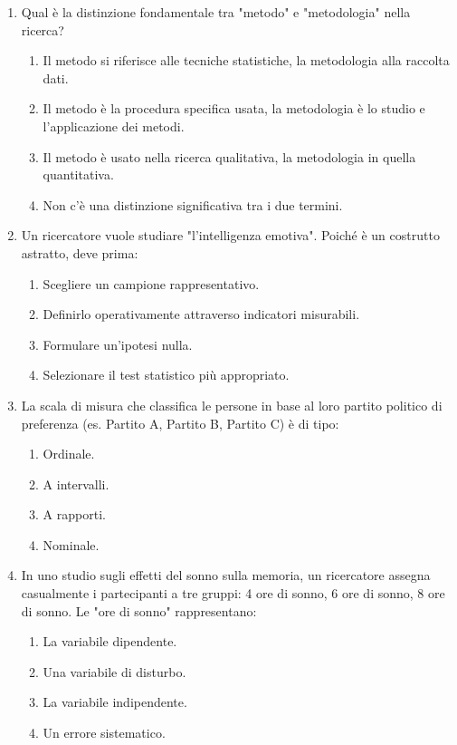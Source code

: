 \documentclass[12pt, a4paper]{article}
\begin{document}
\begin{enumerate}[resume]
    \item Qual è la distinzione fondamentale tra "metodo" e "metodologia" nella ricerca?
    \begin{enumerate}
        \item Il metodo si riferisce alle tecniche statistiche, la metodologia alla raccolta dati.
        \item Il metodo è la procedura specifica usata, la metodologia è lo studio e l'applicazione dei metodi.
        \item Il metodo è usato nella ricerca qualitativa, la metodologia in quella quantitativa.
        \item Non c'è una distinzione significativa tra i due termini.
    \end{enumerate}
    \vspace{0.3cm}

    \item Un ricercatore vuole studiare "l'intelligenza emotiva". Poiché è un costrutto astratto, deve prima:
    \begin{enumerate}
        \item Scegliere un campione rappresentativo.
        \item Definirlo operativamente attraverso indicatori misurabili.
        \item Formulare un'ipotesi nulla.
        \item Selezionare il test statistico più appropriato.
    \end{enumerate}
    \vspace{0.3cm}

    \item La scala di misura che classifica le persone in base al loro partito politico di preferenza (es. Partito A, Partito B, Partito C) è di tipo:
    \begin{enumerate}
        \item Ordinale.
        \item A intervalli.
        \item A rapporti.
        \item Nominale.
    \end{enumerate}
    \vspace{0.3cm}

    \item In uno studio sugli effetti del sonno sulla memoria, un ricercatore assegna casualmente i partecipanti a tre gruppi: 4 ore di sonno, 6 ore di sonno, 8 ore di sonno. Le "ore di sonno" rappresentano:
    \begin{enumerate}
        \item La variabile dipendente.
        \item Una variabile di disturbo.
        \item La variabile indipendente.
        \item Un errore sistematico.
    \end{enumerate}
    \vspace{0.3cm}


\end{enumerate}
\end{document}
